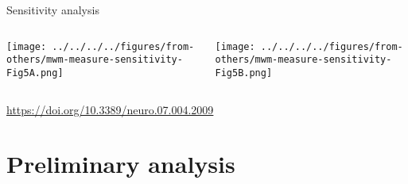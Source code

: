 \documentclass[aspectratio=169]{beamer}
\begin{document}
\begin{frame}{Sensitivity analysis}
\begin{columns}[t]
\begin{column}{0.4\textwidth}

\texttt{[image: ../../../../figures/from-others/mwm-measure-sensitivity-Fig5A.png]}
\end{column}
\begin{column}{0.6\textwidth}

\texttt{[image: ../../../../figures/from-others/mwm-measure-sensitivity-Fig5B.png]}
\end{column}
\end{columns}
\begin{center}
\tiny \url{https://doi.org/10.3389/neuro.07.004.2009}
\end{center}
\end{frame}

\section{Preliminary analysis}
\end{document}
